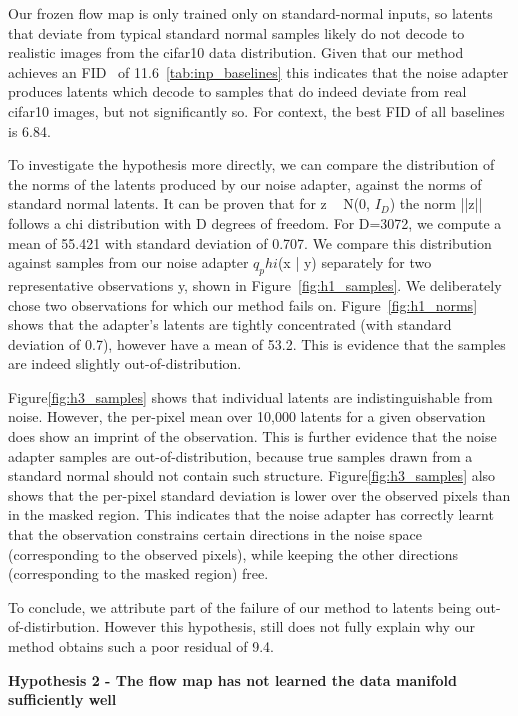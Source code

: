 \documentclass[12pt,a4paper]{report}
\begin{document}
Our frozen flow map is only trained only on standard-normal inputs, so latents that deviate from typical standard normal samples likely do not decode to realistic images from the cifar10 data distribution. 
Given that our method achieves an FID~ of 11.6~\ref{tab:inp_baselines} this indicates that the noise adapter produces latents which decode to samples that do indeed deviate from real cifar10 images, but not significantly so. 
For context, the best FID of all baselines is 6.84. 

To investigate the hypothesis more directly, we can compare the distribution of the norms of the latents produced by our noise adapter, against the norms of standard normal latents. 
It can be proven that for z ~ N(0, $I_D$) the norm ||z|| follows a chi distribution with D degrees of freedom. For D=3072, we compute a mean of 55.421 with standard deviation of 0.707. 
We compare this distribution against samples from our noise adapter $q_phi$(x | y) separately for two representative observations y, shown in Figure~\ref{fig:h1_samples}. We deliberately chose two observations for which our method fails on. 
Figure~\ref{fig:h1_norms} shows that the adapter's latents are tightly concentrated (with standard deviation of 0.7), however have a mean of 53.2. 
This is evidence that the samples are indeed slightly out-of-distribution. 

Figure\ref{fig:h3_samples} shows that individual latents are indistinguishable from noise. However, the per-pixel mean over 10,000 latents for a given observation does show an imprint of the observation. This is further evidence that the noise adapter samples are out-of-distribution, because true samples drawn from a standard normal should not contain such structure. 
Figure\ref{fig:h3_samples} also shows that the per-pixel standard deviation is lower over the observed pixels than in the masked region. This indicates that the noise adapter has correctly learnt that the observation constrains certain directions in the noise space (corresponding to the observed pixels), while keeping the other directions (corresponding to the masked region) free. 

To conclude, we attribute part of the failure of our method to 
latents being out-of-distirbution. However this hypothesis, still does not fully explain why our method obtains such a poor residual of 9.4. 

\textbf{Hypothesis 2 - The flow map has not learned the data manifold sufficiently well}
\end{document}
